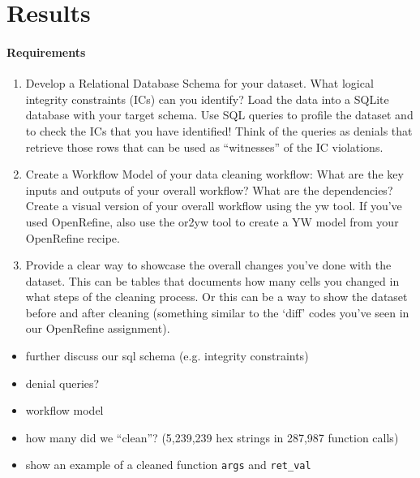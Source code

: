 \section{Results}
\paragraph{Requirements}
\begin{enumerate}[nolistsep]
	\item Develop a Relational Database Schema for your dataset. What logical integrity constraints (ICs) can you identify? Load the data into a SQLite database with your target schema. Use SQL queries to profile the dataset and to check the ICs that you have identified! Think of the queries as denials that retrieve those rows that can be used as ``witnesses'' of the IC violations.
	\item Create a Workflow Model of your data cleaning workflow: What are the key inputs and outputs of your overall workflow? What are the dependencies? Create a visual version of your overall workflow using the yw tool. If you've used OpenRefine, also use the or2yw tool to create a YW model from your OpenRefine recipe.
	\item Provide a clear way to showcase the overall changes you've done with the dataset. This can be tables that documents how many cells you changed in what steps of the cleaning process. Or this can be a way to show the dataset before and after cleaning (something similar to the `diff' codes you've seen in our OpenRefine assignment).
\end{enumerate}

\begin{itemize}[nolistsep]
	\item further discuss our sql schema (e.g. integrity constraints)
	\item denial queries?
	\item workflow model
	\item how many did we ``clean''? (5,239,239 hex strings in 287,987 function calls)
	\item show an example of a cleaned function \texttt{args} and \texttt{ret\_val}
\end{itemize}
